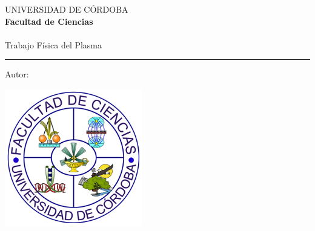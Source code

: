 \AddToShipoutPicture*{\BackgroundPic}
\begin{titlepage}
\begin{center}
\Large UNIVERSIDAD DE CÓRDOBA\\[0.5 cm]
\large  \textbf{Facultad de Ciencias}\\[1.25 cm]
\large \textbf{\titulacion}\\[1.25 cm]
\Large  Trabajo Física del Plasma\\[2.25 cm]
\Huge   \titulo
\end{center}
\vspace{1.25cm}
{\color{blue}\hrule}
\vspace{0.5cm}
\noindent \Large{Autor: \autor}
\vfill
\begin{center}
 \includegraphics[width=6cm]{img/logo_ciencias.png} 
\end{center}
\vfill
\rightline{\fecha}
\end{titlepage}
\renewcommand{\baselinestretch}{0.9}
\ClearShipoutPicture
\restoregeometry